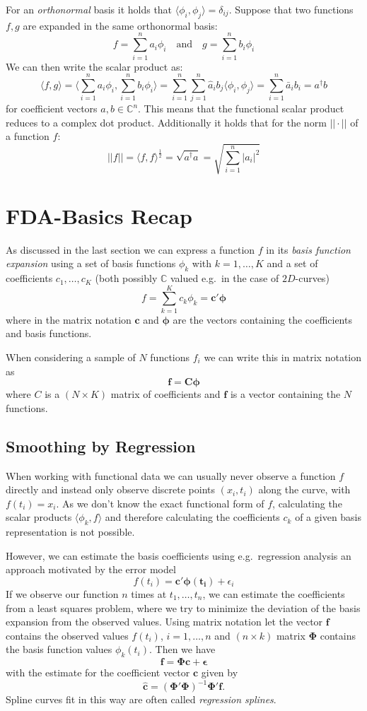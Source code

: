 For an \textit{orthonormal} basis it holds that $\langle \phi_i, \phi_j \rangle = \delta_{ij}$. Suppose that two functions $f,g$ are expanded in the same orthonormal basis:
$$ f = \sum_{i=1}^n a_i \phi_i \quad \text{and} \quad 
  g = \sum_{i=1}^n b_i \phi_i $$
We can then write the scalar product as:
$$ \langle f,g \rangle = 
  \langle \sum_{i=1}^n a_i \phi_i, \sum_{i=1}^n b_i \phi_i \rangle = 
  \sum_{i=1}^n \sum_{j=1}^n \hat{a}_i b_j \langle \phi_i, \phi_j \rangle =
  \sum_{i=1}^n \bar{a}_i b_i = a^\dagger b$$
for coefficient vectors $a, b \in \mathbb{C}^n$. This means that the functional scalar product reduces to a complex dot product. Additionally it holds that for the norm $||\cdot||$ of a function $f$:
$$ ||f|| = \langle f,f \rangle^{\frac{1}{2}} = 
  \sqrt{a^\dagger a} = \sqrt{\sum_{i=1}^n |a_i|^2}$$

\section*{FDA-Basics Recap}
As discussed in the last section we can express a function $f$ in its \textit{basis function expansion} using a set of basis functions $\phi_k$ with $k=1,\dots,K$ and a set of coefficients $c_1,\dots,c_K$ (both possibly $\mathbb{C}$ valued e.g.\ in the case of $2D$-curves)
$$ f = \sum_{k=1}^K c_k \phi_k = \bm{c'}\bm{\phi} $$
where in the matrix notation $\bm{c}$ and $\bm{\phi}$ are the vectors containing the coefficients and basis functions.

When considering a sample of $N$ functions $f_i$ we can write this in matrix notation as 
$$ \bm{f} = \bm{C}\bm{\phi} $$
where $C$ is a $(N \times K)$ matrix of coefficients and $\bm{f}$ is a vector containing the $N$ functions.

\subsection*{Smoothing by Regression}
When working with functional data we can usually never observe a function $f$ directly and instead only observe discrete points $(x_i, t_i)$ along the curve, with $f(t_i) = x_i$.
As we don't know the exact functional form of $f$, calculating the scalar products $\langle \phi_k, f \rangle$ and therefore calculating the coefficients $c_k$ of a given basis representation is not possible.

However, we can estimate the basis coefficients using e.g.\ regression analysis an approach motivated by the error model
$$ f(t_i) = \bm{c'}\bm{\phi(t_i)} + \epsilon_i $$
If we observe our function $n$ times at $t_1,\dots,t_n$, we can estimate the coefficients from a least squares problem, where we try to minimize the deviation of the basis expansion from the observed values.
Using matrix notation let the vector $\bm{f}$ contains the observed values $f(t_i)$, $i=1,\dots,n$ and $(n \times k)$ matrix $\bm{\Phi}$ contains the basis function values $\phi_k(t_i)$.
Then we have
$$ \bm{f} = \bm{\Phi}\bm{c} + \bm{\epsilon} $$
with the estimate for the coefficient vector $\bm{c}$ given by
$$ \hat{\bm{c}} = \left( \bm{\Phi'} \bm{\Phi}\right)^{-1} \bm{\Phi'} \bm{f}. $$
Spline curves fit in this way are often called \textit{regression splines}.


